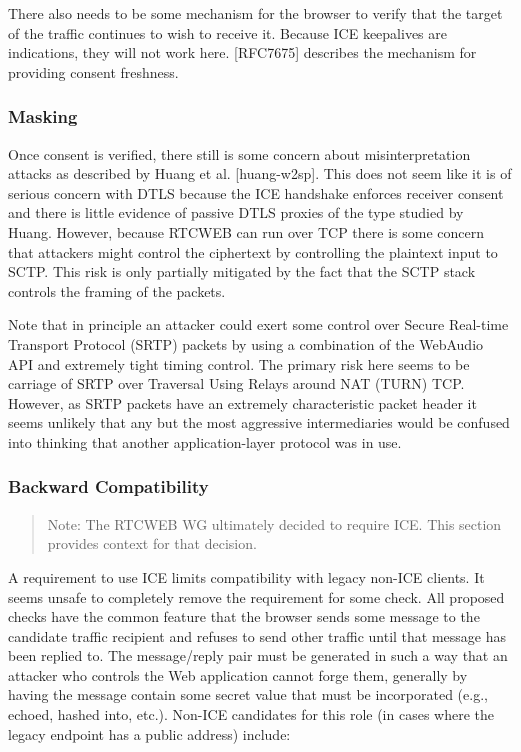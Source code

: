 \documentclass{article}
\begin{document}
There also needs to be some mechanism for the browser to verify that
the target of the traffic continues to wish to receive it.  Because
ICE keepalives are indications, they will not work here.  [RFC7675]
describes the mechanism for providing consent freshness.

\subsubsection{Masking}

Once consent is verified, there still is some concern about
misinterpretation attacks as described by Huang et al. [huang-w2sp].
This does not seem like it is of serious concern with DTLS because
the ICE handshake enforces receiver consent and there is little
evidence of passive DTLS proxies of the type studied by Huang.
However, because RTCWEB can run over TCP there is some concern that
attackers might control the ciphertext by controlling the plaintext
input to SCTP.  This risk is only partially mitigated by the fact
that the SCTP stack controls the framing of the packets.

Note that in principle an attacker could exert some control over
Secure Real-time Transport Protocol (SRTP) packets by using a
combination of the WebAudio API and extremely tight timing control.
The primary risk here seems to be carriage of SRTP over Traversal
Using Relays around NAT (TURN) TCP.  However, as SRTP packets have an
extremely characteristic packet header it seems unlikely that any but
the most aggressive intermediaries would be confused into thinking
that another application-layer protocol was in use.

\subsubsection{Backward Compatibility}

\begin{quote}
Note: The RTCWEB WG ultimately decided to require ICE.  This
section provides context for that decision.
\end{quote}

A requirement to use ICE limits compatibility with legacy non-ICE
clients.  It seems unsafe to completely remove the requirement for
some check.  All proposed checks have the common feature that the
browser sends some message to the candidate traffic recipient and
refuses to send other traffic until that message has been replied to.
The message/reply pair must be generated in such a way that an
attacker who controls the Web application cannot forge them,
generally by having the message contain some secret value that must
be incorporated (e.g., echoed, hashed into, etc.).  Non-ICE
candidates for this role (in cases where the legacy endpoint has a
public address) include:
\end{document}
